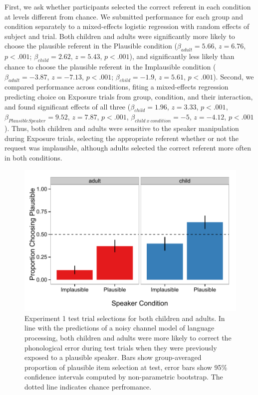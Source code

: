 \documentclass[man,floatsintext]{apa6}
\begin{document}
First, we ask whether participants selected the correct referent in each condition at levels different from chance. We submitted performance for each group and condition separately to a mixed-effects logistic regression with random effects of subject and trial. Both children and adults were significantly more likely to choose the plausible referent in the Plausible condition ($\beta_{adult} = 5.66$, $z = 6.76$, $p <.001$; $\beta_{child} = 2.62$, $z = 5.43$, $p <.001$), and significantly less likely than chance to choose the plausible referent in the Implausible condition ($\beta_{adult} = -3.87$, $z = -7.13$, $p <.001$; $\beta_{child} = -1.9$, $z = 5.61$, $p <.001$). Second, we compared performance across conditions, fiting a mixed-effects regression predicting choice on Exposure trials from group, condition, and their interaction, and found significant effects of all three ($\beta_{child} = 1.96$,  $z = 3.33$, $p <.001$, $\beta_{Plausible Speaker} = 9.52$,  $z = 7.87$, $p <.001$,  $\beta_{child\: x \: condition} = -5$,  $z = -4.12$, $p <.001$). Thus, both children and adults were sensitive to the speaker manipulation during Exposure trials, selecting the appropriate referent whether or not the request was implausible, although adults selected the correct referent more often in both conditions.

\begin{figure}[t]
     \begin{center}
     \includegraphics[width=\textwidth]{figures/exp1_results.pdf}
    \end{center}
    \caption{Experiment 1 test trial selections for both children and adults. In line with the predictions of a noisy channel model of language processing, both children and adults were more likely to correct the phonological error during test trials when they were previously exposed to a plausible speaker. Bars show group-averaged proportion of plausible item selection at test, error bars show 95\% confidence intervals computed by non-parametric bootstrap. The dotted line indicates chance perfromance.}%
   \label{fig:exp1_results}
\end{figure}
\end{document}
